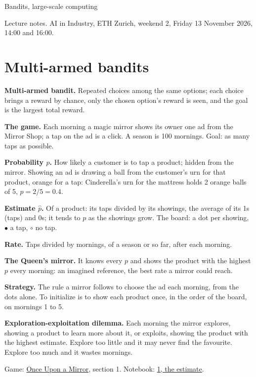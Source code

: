 \documentclass[11pt,a4paper]{article}
\newcommand{\term}[1]{\textbf{#1}}
\newcommand{\Mirror}{\href{https://eth-ainit-hs26.github.io/AINIT-PAGE/viz/we2/mirror/}{Once Upon a Mirror}}
\newcommand{\NbOne}{\href{https://colab.research.google.com/github/eth-ainit-hs26/w2-cx-public/blob/main/03_cx_bandits_1_estimates_student.ipynb}{1, the estimate}}
\begin{document}
{\LARGE\bfseries\raggedright Bandits, large-scale computing\par}
\smallskip
Lecture notes. AI in Industry, ETH Zurich, weekend 2, Friday 13 November 2026, 14:00 and 16:00.

\section{Multi-armed bandits}

\term{Multi-armed bandit.} Repeated choices among the same options; each choice brings a reward by chance, only the
chosen option's reward is seen, and the goal is the largest total reward.

\term{The game.} Each morning a magic mirror shows its owner one ad from the Mirror Shop; a tap on the ad is a click.
A season is 100 mornings. Goal: as many taps as possible.

\term{Probability $p$.} How likely a customer is to tap a product; hidden from the mirror. Showing an ad is drawing a
ball from the customer's urn for that product, orange for a tap: Cinderella's urn for the mattress holds 2 orange
balls of 5, $p = 2/5 = 0.4$.
\par\smallskip\noindent\par\smallskip

\term{Estimate $\hat p$.} Of a product: its taps divided by its showings, the average of its 1s (taps) and 0s;
it tends to $p$ as the showings grow. The board: a dot per showing, $\bullet$ a tap, $\circ$ no tap.

\term{Rate.} Taps divided by mornings, of a season or so far, after each morning.

\term{The Queen's mirror.} It knows every $p$ and shows the product with the highest $p$ every morning: an imagined
reference, the best rate a mirror could reach.

\term{Strategy.} The rule a mirror follows to choose the ad each morning, from the dots alone. To initialize is to show
each product once, in the order of the board, on mornings 1 to 5.

\term{Exploration-exploitation dilemma.} Each morning the mirror explores, showing a product to learn more about it,
or exploits, showing the product with the highest estimate. Explore too little and it may never find the favourite.
Explore too much and it wastes mornings.

Game: \Mirror, section 1. Notebook: \NbOne.
\end{document}
